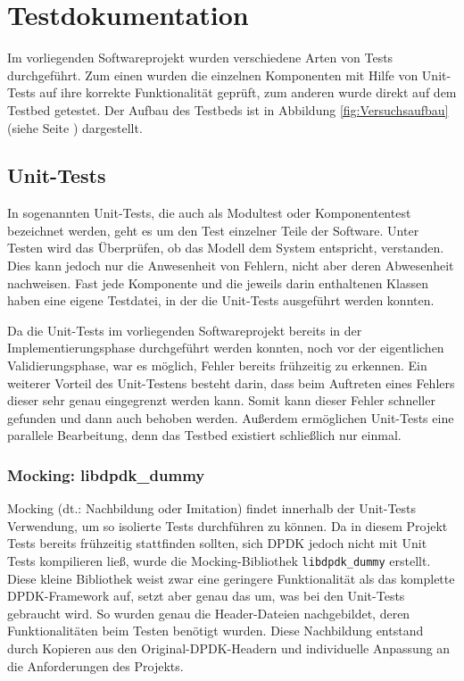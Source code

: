 \documentclass[../review_3.tex]{subfiles}
\begin{document}
\chapter{Testdokumentation}\thispagestyle{fancy}
Im vorliegenden Softwareprojekt wurden verschiedene Arten von Tests durchgeführt. Zum einen wurden die einzelnen Komponenten mit Hilfe von Unit-Tests auf ihre korrekte Funktionalität geprüft, zum anderen wurde direkt auf dem Testbed getestet. Der Aufbau des Testbeds ist in Abbildung \ref{fig:Versuchsaufbau} (siehe Seite \pageref{fig:Versuchsaufbau}) dargestellt.

\section{Unit-Tests}

In sogenannten Unit-Tests, die auch als Modultest oder Komponententest bezeichnet werden, geht es um den Test einzelner Teile der Software. Unter Testen wird das Überprüfen, ob das Modell dem System entspricht, verstanden. Dies kann jedoch nur die Anwesenheit von Fehlern, nicht aber deren Abwesenheit nachweisen. Fast jede Komponente und die jeweils darin enthaltenen Klassen haben eine eigene Testdatei, in der die Unit-Tests ausgeführt werden konnten.

Da die Unit-Tests im vorliegenden Softwareprojekt bereits in der Implementierungsphase durchgeführt werden konnten, noch vor der eigentlichen Validierungsphase, war es möglich, Fehler bereits frühzeitig zu erkennen. Ein weiterer Vorteil des Unit-Testens besteht darin, dass beim Auftreten eines Fehlers dieser sehr genau eingegrenzt werden kann. Somit kann dieser Fehler schneller gefunden und dann auch behoben werden. Außerdem ermöglichen Unit-Tests eine parallele Bearbeitung, denn das Testbed existiert schließlich nur einmal. 

\subsection{Mocking: libdpdk\_dummy}
Mocking (dt.: Nachbildung oder Imitation) findet innerhalb der Unit-Tests Verwendung, um so isolierte Tests durchführen zu können. Da in diesem Projekt Tests bereits frühzeitig stattfinden sollten, sich DPDK jedoch nicht mit Unit Tests kompilieren ließ, wurde die Mocking-Bibliothek \texttt{libdpdk\_dummy} erstellt. Diese kleine Bibliothek weist zwar eine geringere Funktionalität als das komplette DPDK-Framework auf, setzt aber genau das um, was bei den Unit-Tests gebraucht wird. So wurden genau die Header-Dateien nachgebildet, deren Funktionalitäten beim Testen benötigt wurden. Diese Nachbildung entstand durch Kopieren aus den \glqq Original-DPDK-Headern\grqq{} und individuelle Anpassung an die Anforderungen des Projekts.
\end{document}
